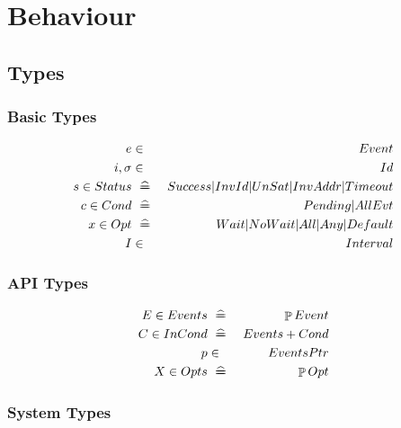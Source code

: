 \section{Behaviour}

\subsection{Types}

\subsubsection{Basic Types}

\begin{eqnarray*}
   e              &\in& Event
\\ i,\sigma       &\in& Id
\\ s \in Status &\defs& Success | InvId | UnSat | InvAddr | Timeout
\\ c \in Cond   &\defs& Pending | AllEvt
\\ x \in Opt    &\defs& Wait | NoWait | All | Any | Default
\\ I              &\in& Interval
\end{eqnarray*}

\subsubsection{API Types}

\begin{eqnarray*}
   E \in Events &\defs& \Set{Event}
\\ C \in InCond &\defs& Events + Cond
\\ p              &\in& EventsPtr
\\ X \in Opts   &\defs& \Set{Opt}
\end{eqnarray*}


\subsubsection{System Types}

